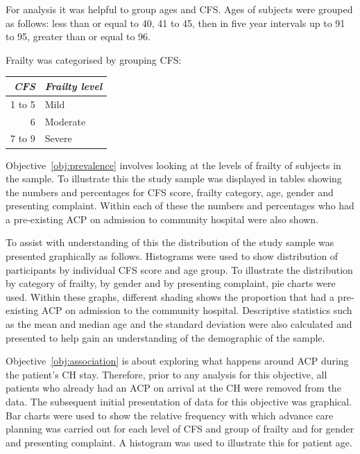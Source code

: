 \documentclass
[
	12pt,
	a4paper,
	oneside,
]{report}
\begin{document}
For analysis it was helpful to group ages and CFS. Ages of subjects were 
grouped as follows: less than or equal to 40, 41 to 45, then in five year 
intervals up to 91 to 95, greater than or equal to 96.

Frailty was categorised by grouping CFS:
\label{ref:cfs-grouping}

\begin{center}
\begin{tabular}{ r l }
\emph{CFS} & \emph{Frailty level} \\
\hline
1 to 5	& Mild	\\
6		& Moderate \\
7 to 9	& Severe \\
\end{tabular}
\end{center}

Objective~\ref{obj:prevalence} involves looking at the levels of frailty of
subjects in the sample. To illustrate this the study sample was 
displayed in tables showing the numbers and percentages for CFS score, 
frailty category, age, gender and presenting complaint. Within each
of these the numbers and percentages who had a pre-existing ACP
on admission to community hospital were also shown.

To assist with understanding of this the distribution of the study sample 
was presented graphically as follows.
Histograms were used to show distribution of participants by individual 
CFS score and age group.  
To illustrate the distribution by category of frailty, by gender and by 
presenting 
complaint, pie charts were used. Within these graphs, different shading shows
the proportion that had a pre-existing ACP on admission to the community hospital.
Descriptive statistics such as the mean and median age and the standard deviation
were also calculated and presented to help gain an understanding of the 
demographic of the sample.

Objective~\ref{obj:association} is about exploring what happens around ACP
during the patient's CH stay. Therefore, prior to any analysis for this 
objective, all patients who already had an ACP on arrival at the CH were
removed from the data.
The subsequent initial presentation of data for this objective was
graphical. Bar charts were used to show the relative frequency with which 
advance care planning
was carried out for each level of CFS and group of frailty and for gender and
presenting complaint. A histogram was used to illustrate this for patient age.
\end{document}
